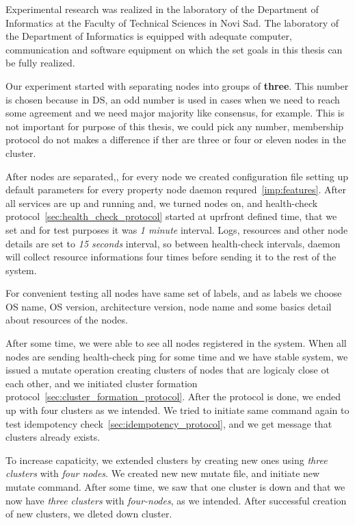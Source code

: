 Experimental research was realized in the laboratory of the Department of Informatics at the Faculty of Technical Sciences in Novi Sad. The laboratory of the Department of Informatics is equipped with adequate computer, communication and software equipment on which the set goals in this thesis can be fully realized.

Our experiment started with separating nodes into groups of \textbf{three}. This number is chosen because in DS, an odd number is used in cases when we need to reach some agreement and we need major majority like consensus, for example. This is not important for purpose of this thesis, we could pick any number, membership protocol do not makes a difference if ther are three or four or eleven nodes in the cluster.

After nodes are separated,, for every node we created configuration file setting up default parameters for every property node daemon requred~\ref{imp:features}. After all services are up and running and, we turned nodes on, and health-check protocol~\ref{sec:health_check_protocol} started at uprfront defined time, that we set and for test purposes it was \emph{1 minute} interval. Logs, resources and other node details are set to \emph{15 seconds} interval, so between health-check intervals, daemon will collect resource informations  four times before sending it to the rest of the system.

For convenient testing all nodes have same set of labels, and as labels we choose OS name, OS version, architecture version, node name and some basics detail about resources of the nodes.

After some time, we were able to see all nodes registered in the system. When all nodes are sending health-check ping for some time and we have stable system, we issued a mutate operation creating clusters of nodes that are logicaly close ot each other, and we initiated cluster formation protocol~\ref{sec:cluster_formation_protocol}. After the protocol is done, we ended up with four clusters as we intended. We tried to initiate same command again to test idempotency check~\ref{sec:idempotency_protocol}, and we get message that clusters already exists.

To increase capaticity, we extended clusters by creating new ones using \emph{three clusters} with \emph{four nodes}. We created new new mutate file, and initiate new mutate command. After some time, we saw that one cluster is down and that we now have \emph{three clusters} with \emph{four-nodes}, as we intended. After successful creation of new clusters, we dleted down cluster.

